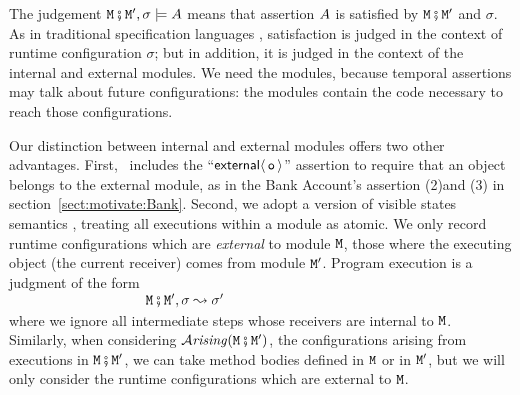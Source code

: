 
The judgement ${\mbox{\tt{\ensuremath{{\mbox{\tt{M}}}}}}} \fatsemi  {{\mbox{\tt{\ensuremath{{\mbox{\tt{M}}}}}}}'},\sigma \models A$ means that  
assertion $A$ is satisfied by  ${\mbox{\tt{\ensuremath{{\mbox{\tt{M}}}}}}} \fatsemi  {{\mbox{\tt{\ensuremath{{\mbox{\tt{M}}}}}}}'}$ and $\sigma$.  
As in traditional specification languages \cite{Leavens-etal07,Meyer92}, satisfaction is judged 
in the context of  runtime configuration $\sigma$; but in addition, it is judged in the context of the internal and external modules.
We need the modules, because temporal assertions may
talk about future configurations: the modules contain the code necessary to reach those configurations.

Our distinction between internal and external modules offers two other advantages.
First, 
\Chainmail\ includes the ``${\mathsf{external}}\langle\, {\mbox{\tt{o}}}\, \rangle$'' assertion to require
that an object belongs to the external module, as in the Bank
Account's assertion (2)and (3) in
section~\ref{sect:motivate:Bank}. Second, we adopt a version of
visible states semantics \cite{MuellerPoetzsch-HeffterLeavens06,other-visible-state-semantics}, treating all
executions within a module as atomic.
We only record runtime configurations which are {\em external}
 to module ${\mbox{\tt{\ensuremath{{\mbox{\tt{M}}}}}}}$, \ie those where the
 executing object (\ie the current receiver) comes from module ${\mbox{\tt{\ensuremath{{\mbox{\tt{M}}}}}}}'$.
 Program execution is
 a judgment of the form\\
 $~ \strut  \hspace{1.3in}    {\mbox{\tt{\ensuremath{{\mbox{\tt{M}}}}}}} \fatsemi  {{\mbox{\tt{\ensuremath{{\mbox{\tt{M}}}}}}}'},\sigma \leadsto \sigma'$\\  
 where we ignore all intermediate steps
 whose receivers are internal to ${\mbox{\tt{\ensuremath{{\mbox{\tt{M}}}}}}}$. 
Similarly, when considering ${\mathcal{A}}\textrm{\textit{rising}}({\mbox{\tt{\ensuremath{{\mbox{\tt{M}}}}}}} \fatsemi  {{\mbox{\tt{\ensuremath{{\mbox{\tt{M}}}}}}}'})$, \ie the configurations arising from 
executions in ${\mbox{\tt{\ensuremath{{\mbox{\tt{M}}}}}}} \fatsemi  {{\mbox{\tt{\ensuremath{{\mbox{\tt{M}}}}}}}'}$, we can take method bodies defined in ${\mbox{\tt{\ensuremath{{\mbox{\tt{M}}}}}}}$ or in ${\mbox{\tt{\ensuremath{{\mbox{\tt{M}}}}}}}'$, but we will only consider the runtime 
configurations which are external to ${\mbox{\tt{\ensuremath{{\mbox{\tt{M}}}}}}}$.



